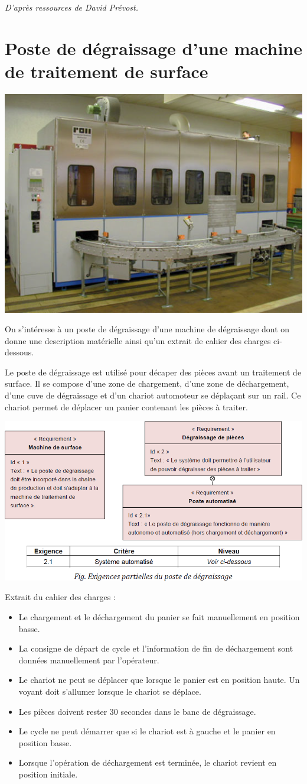 \documentclass[10pt]{article}
\begin{document}


\begin{flushright}
\textit{D'après ressources de David Prévost.}
\end{flushright}

\section{Poste de dégraissage d’une machine de traitement de surface}
\begin{center}
\includegraphics[width=.5\textwidth]{images/fig_01}
\end{center}
On s'intéresse à un poste de dégraissage d’une machine de dégraissage dont on donne une
description matérielle ainsi qu’un extrait de cahier des charges ci-dessous.

Le poste de dégraissage est utilisé pour décaper des pièces avant un traitement de surface. Il se
compose d’une zone de chargement, d’une zone de déchargement, d’une cuve de dégraissage et
d’un chariot automoteur se déplaçant sur un rail. Ce chariot permet de déplacer un panier
contenant les pièces à traiter.

\begin{center}
\includegraphics[width=.5\textwidth]{images/fig_02}
\end{center}

Extrait du cahier des charges :
\begin{itemize}
\item Le chargement et le déchargement du panier se fait manuellement en position basse.
\item La consigne de départ de cycle et l’information de fin de déchargement sont données
manuellement par l’opérateur.
\item Le chariot ne peut se déplacer que lorsque le panier est en position haute. Un voyant doit
s’allumer lorsque le chariot se déplace.
\item Les pièces doivent rester 30 secondes dans le banc de dégraissage.
\item Le cycle ne peut démarrer que si le chariot est à gauche et le panier en position basse.
\item Lorsque l’opération de déchargement est terminée, le chariot revient en position initiale.
\end{itemize}
\end{document}
